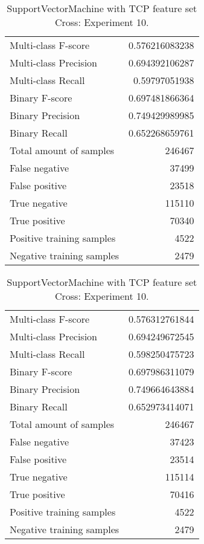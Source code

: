 \begin{table}[H]
\begin{minipage}{0.5\textwidth}
\caption{SupportVectorMachine with TCP feature set Cross: Experiment 9.}
\centering
\begin{tabular}{l r}
\toprule
Multi-class F-score & 0.576216083238 \\
Multi-class Precision & 0.694392106287 \\
Multi-class Recall & 0.59797051938 \\
\midrule
Binary F-score & 0.697481866364 \\
Binary Precision & 0.749429989985 \\
Binary Recall & 0.652268659761 \\
\midrule
Total amount of samples & 246467 \\
False negative & 37499 \\
False positive & 23518 \\
True negative & 115110 \\
True positive & 70340 \\
\midrule
Positive training samples & 4522 \\
Negative training samples & 2479 \\
\bottomrule
\end{tabular}
\end{minipage}
\hfillx
\begin{minipage}{0.5\textwidth}
\caption{SupportVectorMachine with TCP feature set Cross: Experiment 10.}
\centering
\begin{tabular}{l r}
\toprule
Multi-class F-score & 0.576312761844 \\
Multi-class Precision & 0.694249672545 \\
Multi-class Recall & 0.598250475723 \\
\midrule
Binary F-score & 0.697986311079 \\
Binary Precision & 0.749664643884 \\
Binary Recall & 0.652973414071 \\
\midrule
Total amount of samples & 246467 \\
False negative & 37423 \\
False positive & 23514 \\
True negative & 115114 \\
True positive & 70416 \\
\midrule
Positive training samples & 4522 \\
Negative training samples & 2479 \\
\bottomrule
\end{tabular}
\end{minipage}
\end{table}
